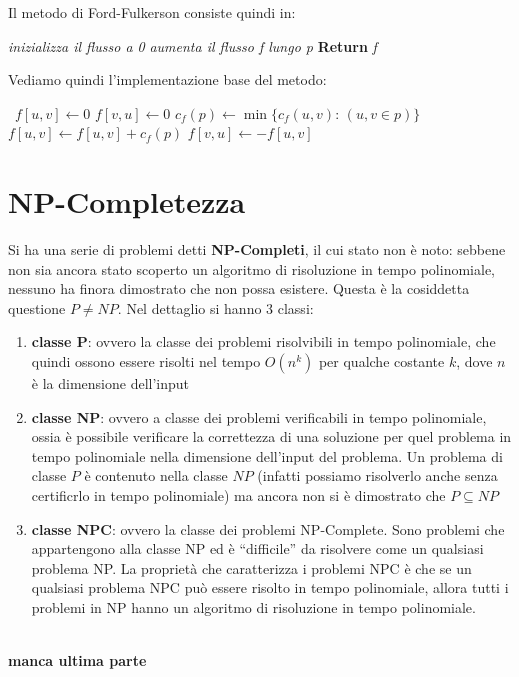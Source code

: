 \documentclass[a4paper,12pt, oneside]{book}
\begin{document}
Il metodo di Ford-Fulkerson consiste quindi in:
\begin{algorithm}[H]
  \begin{algorithmic}
    \State \textit{inizializza il flusso a 0}
    \State \textit{aumenta il flusso f lungo p}
    \EndWhile
    \State \textbf{Return} \textit{f}
    \EndFunction
  \end{algorithmic}
\end{algorithm}
Vediamo quindi l'implementazione base del metodo:
\begin{algorithm}[H]
  \begin{algorithmic}
 \   \State $f[u,v]\gets 0$
    \State $f[v,u]\gets 0$
    \EndFor
    \State $c_f(p)\gets \min\{c_f(u,v):\,(u,v\in p)\}$
    \State $f[u,v]\gets f[u,v]+c_f(p)$
    \State $f[v,u]\gets -f[u,v]$
    \EndFor
    \EndWhile
    \EndFunction
  \end{algorithmic}
\end{algorithm}
\chapter{NP-Completezza}
Si ha una serie di problemi detti \textbf{NP-Completi}, il cui stato
non è noto: sebbene non sia ancora stato scoperto un algoritmo di
risoluzione in tempo polinomiale, nessuno ha finora dimostrato che non
possa esistere. Questa è la cosiddetta questione $P\neq NP$. Nel
dettaglio si hanno 3 classi:
\begin{enumerate}
  \item \textbf{classe P}: ovvero la classe dei problemi risolvibili
  in tempo polinomiale, che quindi ossono essere risolti nel tempo
  $O(n^k)$ per qualche costante $k$, dove $n$ è la dimensione
  dell’input
  \item \textbf{classe NP}: ovvero a classe dei problemi verificabili
  in tempo polinomiale, ossia è possibile 
  verificare la correttezza di una soluzione per quel problema in tempo
  polinomiale nella dimensione dell’input del problema. Un problema di
  classe $P$ è contenuto nella classe $NP$ (infatti possiamo
  risolverlo anche senza certificrlo in tempo polinomiale) ma ancora
  non si è dimostrato che $P\subseteq NP$
  \item \textbf{classe NPC}: ovvero la classe dei problemi
  NP-Complete. Sono problemi che appartengono alla classe NP ed è
  “difficile” da risolvere come un qualsiasi problema NP. La proprietà
  che caratterizza i problemi NPC è che se un qualsiasi problema NPC
  può essere risolto in tempo polinomiale, allora tutti i problemi 
  in NP hanno un algoritmo di risoluzione in tempo polinomiale. 
\end{enumerate}
\\
\textbf{manca ultima parte}
\end{document}
